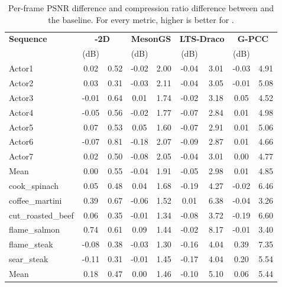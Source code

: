 \begin{table}[t]
    \centering
    \scalebox{0.90}
    {
        \begin{tabular}{l|cc|cc|cc|cc}
        \toprule
        \textbf{Sequence} & \multicolumn{2}{c|}{\textbf{\vthree{}-2D}} & \multicolumn{2}{c|}{\textbf{MesonGS}} & \multicolumn{2}{c|}{\textbf{LTS-Draco}} & \multicolumn{2}{c}{\textbf{G-PCC}} \\
                 & \textbf{\dpsnr{}} (dB) & \textbf{\rcr{}} & \textbf{\dpsnr{}} (dB) & \textbf{\rcr{}} & \textbf{\dpsnr{}} (dB) & \textbf{\rcr{}} & \textbf{\dpsnr{}} (dB) & \textbf{\rcr{}} \\
        \midrule
        Actor1 & 0.02 & 0.52 & -0.02 & 2.00 & -0.04 & 3.01 & -0.03 & 4.91 \\
        Actor2 & 0.03 & 0.31 & -0.03 & 2.11 & -0.04 & 3.05 & -0.01 & 5.08 \\
        Actor3 & -0.01 & 0.64 & 0.01 & 1.74 & -0.02 & 3.18 & 0.05 & 4.52 \\
        Actor4 & -0.05 & 0.56 & -0.02 & 1.77 & -0.07 & 2.84 & 0.01 & 4.98 \\
        Actor5 & 0.07 & 0.53 & 0.05 & 1.60 & -0.07 & 2.91 & 0.01 & 5.06 \\
        Actor6 & -0.07 & 0.81 & -0.18 & 2.07 & -0.09 & 2.87 & 0.01 & 4.66 \\
        Actor7 & 0.02 & 0.50 & -0.08 & 2.05 & -0.04 & 3.01 & 0.00 & 4.77 \\
        \hline
        Mean & 0.00 & 0.55 & -0.04 & 1.91 & -0.05 & 2.98 & 0.01 & 4.85 \\
        \midrule
        cook\_spinach & 0.05 & 0.48 & 0.04 & 1.68 & -0.19 & 4.27 & -0.02 & 6.46 \\
        coffee\_martini & 0.39 & 0.67 & -0.06 & 1.52 & 0.01 & 6.38 & -0.04 & 3.26 \\
        cut\_roasted\_beef & 0.06 & 0.35 & -0.01 & 1.34 & -0.08 & 3.72 & -0.19 & 6.60 \\
        flame\_salmon & 0.74 & 0.61 & 0.09 & 1.44 & -0.02 & 8.17 & -0.01 & 3.40 \\
        flame\_steak & -0.08 & 0.38 & -0.03 & 1.30 & -0.16 & 4.04 & 0.39 & 7.35 \\
        sear\_steak & -0.11 & 0.31 & -0.01 & 1.45 & -0.17 & 4.04 & 0.20 & 5.54 \\
        \hline
        Mean & 0.18 & 0.47 & 0.00 & 1.46 & -0.10 & 5.10 & 0.06 & 5.44 \\
        \bottomrule
        \end{tabular}
    }
    \caption{Per-frame PSNR difference and compression ratio difference between \gsnfs{} and the baseline. For every metric, higher is better for \gsnfs{}.
    }
    \label{tab:baseline-psnr-comp}
  \end{table}

